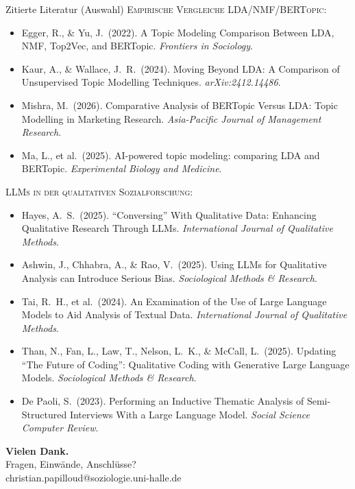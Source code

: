 \documentclass[aspectratio=169,11pt]{beamer}
\let\oldemph\emph
\renewcommand{\emph}[1]{{\color{solCyan}\oldemph{#1}}}
\begin{document}
\begin{frame}[allowframebreaks]{Zitierte Literatur (Auswahl)}
  \medskip
  \textsc{Empirische Vergleiche LDA/NMF/BERTopic:}
  \begin{itemize}
    \item Egger, R., \& Yu, J.\ (2022). A Topic Modeling Comparison
          Between LDA, NMF, Top2Vec, and BERTopic.
          \emph{Frontiers in Sociology}.
    \item Kaur, A., \& Wallace, J.\ R.\ (2024). Moving Beyond LDA:
          A Comparison of Unsupervised Topic Modelling Techniques.
          \emph{arXiv:2412.14486}.
    \item Mishra, M.\ (2026). Comparative Analysis of BERTopic Versus
          LDA: Topic Modelling in Marketing Research.
          \emph{Asia-Pacific Journal of Management Research}.
    \item Ma, L., et al.\ (2025). AI-powered topic modeling:
          comparing LDA and BERTopic.
          \emph{Experimental Biology and Medicine}.
  \end{itemize}

  \medskip
  \textsc{LLMs in der qualitativen Sozialforschung:}
  \begin{itemize}
    \item Hayes, A.\ S.\ (2025). \enquote{Conversing} With Qualitative
          Data: Enhancing Qualitative Research Through LLMs.
          \emph{International Journal of Qualitative Methods}.
    \item Ashwin, J., Chhabra, A., \& Rao, V.\ (2025). Using LLMs for
          Qualitative Analysis can Introduce Serious Bias.
          \emph{Sociological Methods \& Research}.
    \item Tai, R.\ H., et al.\ (2024). An Examination of the Use of
          Large Language Models to Aid Analysis of Textual Data.
          \emph{International Journal of Qualitative Methods}.
    \item Than, N., Fan, L., Law, T., Nelson, L.\ K., \& McCall, L.\
          (2025). Updating \enquote{The Future of Coding}: Qualitative
          Coding with Generative Large Language Models.
          \emph{Sociological Methods \& Research}.
    \item De Paoli, S.\ (2023). Performing an Inductive Thematic
          Analysis of Semi-Structured Interviews With a Large Language
          Model. \emph{Social Science Computer Review}.
  \end{itemize}

\end{frame}

\begin{frame}[plain]
  \begin{center}
    \vspace*{2em}
    {\Large\bfseries Vielen Dank.}
    \\[2em]
    Fragen, Einwände, Anschlüsse?
    \\[3em]
    \footnotesize\color{black!60}
    christian.papilloud@soziologie.uni-halle.de
  \end{center}
\end{frame}
\end{document}
